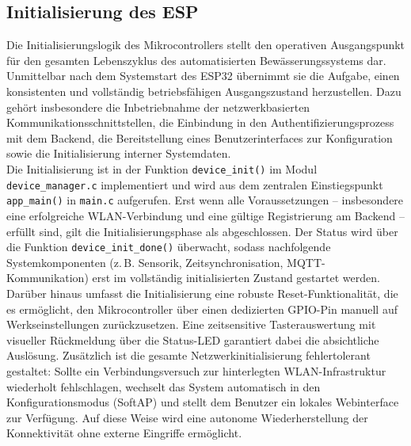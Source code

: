 \subsection{Initialisierung des ESP}
\label{sec:initlogik}

Die Initialisierungslogik des Mikrocontrollers stellt den operativen Ausgangspunkt für den gesamten Lebenszyklus des automatisierten Bewässerungssystems dar. Unmittelbar nach dem Systemstart des ESP32 übernimmt sie die Aufgabe, einen konsistenten und vollständig betriebsfähigen Ausgangszustand herzustellen. Dazu gehört insbesondere die Inbetriebnahme der netzwerkbasierten Kommunikationsschnittstellen, die Einbindung in den Authentifizierungsprozess mit dem Backend, die Bereitstellung eines Benutzerinterfaces zur Konfiguration sowie die Initialisierung interner Systemdaten.
\\
Die Initialisierung ist in der Funktion \texttt{device\_init()} im Modul \texttt{device\_manager.c} implementiert und wird aus dem zentralen Einstiegspunkt \texttt{app\_main()} in \texttt{main.c} aufgerufen. Erst wenn alle Voraussetzungen – insbesondere eine erfolgreiche WLAN-Verbindung und eine gültige Registrierung am Backend – erfüllt sind, gilt die Initialisierungsphase als abgeschlossen. Der Status wird über die Funktion \texttt{device\_init\_done()} überwacht, sodass nachfolgende Systemkomponenten (z.\,B. Sensorik, Zeitsynchronisation, MQTT-Kommunikation) erst im vollständig initialisierten Zustand gestartet werden.
\\
Darüber hinaus umfasst die Initialisierung eine robuste Reset-Funktionalität, die es ermöglicht, den Mikrocontroller über einen dedizierten GPIO-Pin manuell auf Werkseinstellungen zurückzusetzen. Eine zeitsensitive Tasterauswertung mit visueller Rückmeldung über die Status-LED garantiert dabei die absichtliche Auslösung. Zusätzlich ist die gesamte Netzwerkinitialisierung fehlertolerant gestaltet: Sollte ein Verbindungsversuch zur hinterlegten WLAN-Infrastruktur wiederholt fehlschlagen, wechselt das System automatisch in den Konfigurationsmodus (SoftAP) und stellt dem Benutzer ein lokales Webinterface zur Verfügung. Auf diese Weise wird eine autonome Wiederherstellung der Konnektivität ohne externe Eingriffe ermöglicht.

